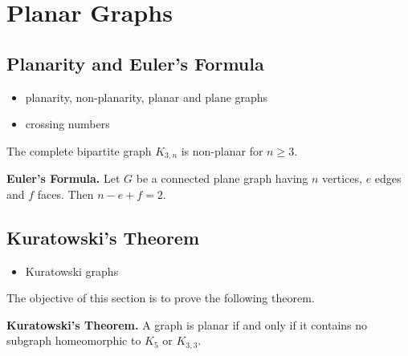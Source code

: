 
\chapter{Planar Graphs}
\label{chap:planar_graphs}



\section{Planarity and Euler's Formula}

\begin{itemize}
\item planarity, non-planarity, planar and plane graphs

\item crossing numbers
\end{itemize}

\begin{theorem}
The complete bipartite graph $K_{3,n}$ is non-planar for $n \geq 3$.
\end{theorem}

\begin{theorem}
\textbf{Euler's Formula.}
Let $G$ be a connected plane graph having $n$ vertices, $e$ edges and
$f$ faces. Then $n - e + f = 2$.
\end{theorem}



\section{Kuratowski's Theorem}

\begin{itemize}
\item Kuratowski graphs
\end{itemize}

The objective of this section is to prove the following theorem.

\begin{theorem}
\textbf{Kuratowski's Theorem.}
A graph is planar if and only if it contains no subgraph homeomorphic
to $K_5$ or $K_{3,3}$.
\end{theorem}


